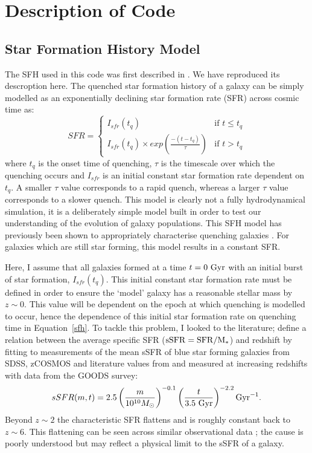 \documentclass[useAMS,usenatbib]{mn2e}
\begin{document}
\section{Description of Code}\label{sec:code}

\subsection{Star Formation History Model}\label{sec:sfh}

The SFH used in this code was first described in \cite{smethurst15}. We have reproduced its descroption here. The quenched star formation history of a galaxy can be simply modelled as an exponentially declining star formation rate (SFR) across cosmic time as:
\begin{equation}\label{sfh}
SFR =
\begin{cases}
I_{sfr}(t_q) & \text{if } t \leq t_q \\
I_{sfr}(t_q) \times exp{\left( \frac{-(t-t_{q})}{\tau}\right)} & \text{if } t > t_q 
\end{cases}
\end{equation}
where $t_{q}$ is the onset time of quenching, $\tau$ is the timescale over which the quenching occurs and $I_{sfr}$ is an initial constant star formation rate dependent on $t_q$.  A smaller $\tau$ value corresponds to a rapid quench, whereas a larger $\tau$ value corresponds to a slower quench. This model is clearly not a fully hydrodynamical simulation, it is a deliberately simple model built in order to test our understanding of the evolution of galaxy populations. This SFH model has previously been shown to appropriately characterise quenching galaxies \citep{weiner06, martin07, noeske07,schawinski14}. For galaxies which are still star forming, this model results in a constant SFR.

Here, I assume that all galaxies formed at a time $t=0~\rm{Gyr}$ with an initial burst of star formation, $I_{sfr}(t_q)$. This initial constant star formation rate must be defined in order to ensure the `model' galaxy  has a reasonable stellar mass by $z\sim0$. This value will be dependent on the epoch at which quenching is modelled to occur, hence the dependence of this initial star formation rate on quenching time in Equation~\ref{sfh}. To tackle this problem, I looked to the literature; \citet[][Equation 1]{peng10} define a relation between the average specific SFR ($\rm{sSFR}=SFR/M_*$) and redshift by fitting to measurements of the mean sSFR of blue star forming galaxies from SDSS, zCOSMOS and literature values from \cite{elbaz07} and \cite{daddi07} measured at increasing redshifts with data from the GOODS survey:
\begin{equation}\label{eq:peng}
sSFR(m,t) = 2.5 \left( \frac{m}{10^{10} M_{\odot}} \right)^{-0.1} \left(\frac{t}{3.5 ~\rm{Gyr}}\right)^{-2.2} \rm{Gyr}^{-1}.
\end{equation}
Beyond $z \sim 2$ the characteristic SFR flattens and is roughly constant back to $z\sim6$. This flattening can be seen across similar observational data \citep{peng10, gonzalez10, bethermin12}; the cause is poorly understood but may reflect a physical limit to the sSFR of a galaxy. 
\end{document}
